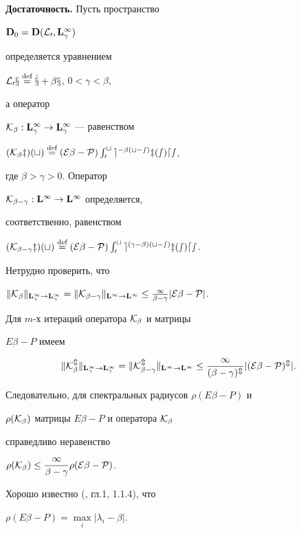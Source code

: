 \begin{pf} {\bf Достаточность.} Пусть пространство


$\bold D_0=\bold D(\cal L_0,\bold L^\infty_\gamma)$


определяется уравнением


$\cal L_0x\overset{\text{def}}{=}\Dot x+\beta x$, $0<\gamma<\beta$,


а оператор


$\cal K_\beta:\bold L^\infty_\gamma\to\bold L^\infty_\gamma$ --- равенством


$(\cal K_\beta z)(t)\overset{\text{def}}{=}(E\beta-P)\int_0^te^{-\beta(t-s)}z(s)ds$,


где $\beta>\gamma>0$. Оператор


$\cal K_{\beta-\gamma}:\bold L^\infty\to\bold L^\infty$ определяется,


соответственно, равенством


$(\cal K_{\beta-\gamma}z)(t)\overset{\text{def}}{=}(E\beta-P)\int_0^t e^{(\gamma-\beta)(t-s)}z(s)ds$.





Нетрудно проверить, что


$\|\cal K_\beta\|_{\bold L^\infty_\gamma\to\bold L^\infty_\gamma}=


\|\cal K_{\beta-\gamma}\|_{\bold L^\infty\to\bold L^\infty}\le


\frac{1}{\beta-\gamma}|E\beta-P|$.


Для $m$-х итераций оператора $\cal K_\beta$ и матрицы


$E\beta-P$ имеем


$$


\|\cal K_\beta^m\|_{\bold L^\infty_\gamma\to\bold L^\infty_\gamma}=


\|\cal K_{\beta-\gamma}^m\|_{\bold L^\infty\to\bold L^\infty}\le


\frac{1}{(\beta-\gamma)^m}|(E\beta-P)^m|.


$$


Следовательно, для спектральных радиусов $\rho(E\beta-P)$ и


$\rho(\cal K_\beta)$ матрицы $E\beta-P$ и оператора $\cal K_\beta$


справедливо неравенство


$\rho(\cal K_\beta)\le\dfrac{1}{\beta-\gamma}\rho(E\beta-P)$.





Хорошо известно (\cite{Horn}, гл.1, 1.1.4), что


$\rho(E\beta-P)=\max\limits_i|\lambda_i - \beta|$.



\end{pf}
